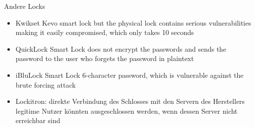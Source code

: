 	Andere Locks
	\begin{itemize}
		\item Kwikset Kevo smart lock but the physical lock contains serious vulnerabilities making it easily compromised, which only takes 10 seconds\cite{Ye2017}
		\item QuickLock Smart Lock does not encrypt the passwords and sends the password to the user who forgets the password in plaintext\cite{Ye2017}
		\item iBluLock Smart Lock 6-character password, which is vulnerable against the brute forcing attack\cite{Ye2017}
		\item Lockitron: direkte Verbindung des Schlosses mit den Servern des Herstellers \textrightarrow legitime Nutzer könnten ausgeschlossen werden, wenn dessen Server nicht erreichbar sind
	\end{itemize}
	
